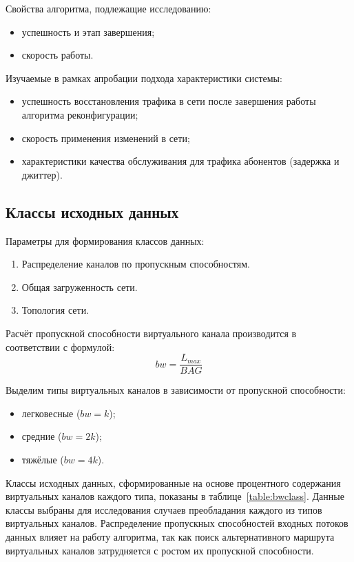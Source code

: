 \documentclass[12pt, a4paper]{article}
\begin{document}
Свойства алгоритма, подлежащие исследованию:
\begin{itemize}
	\item успешность и этап завершения;
	\item скорость работы.
\end{itemize}

Изучаемые в рамках апробации подхода характеристики системы:
\begin{itemize}
	\item успешность восстановления трафика в сети после завершения работы алгоритма реконфигурации;
	\item скорость применения изменений в сети;
	\item характеристики качества обслуживания для трафика абонентов (задержка и джиттер).
\end{itemize}

\subsection{Классы исходных данных}
Параметры для формирования классов данных:
\begin{enumerate}
	\item Распределение каналов по пропускным способностям.
	\item Общая загруженность сети.
	\item Топология сети.
\end{enumerate}

Расчёт пропускной способности виртуального канала производится в соответствии с формулой:
$$bw = \frac{L_{max}}{BAG}$$

Выделим типы виртуальных каналов в зависимости от пропускной способности:
\begin{itemize}
	\item легковесные ($bw=k$);
	\item средние ($bw=2k$);
	\item тяжёлые ($bw=4k$).
\end{itemize}

Классы исходных данных, сформированные на основе процентного содержания виртуальных каналов каждого типа, показаны в таблице~\ref{table:bwclass}. Данные классы выбраны для исследования случаев преобладания каждого из типов виртуальных каналов. Распределение пропускных способностей входных потоков данных влияет на работу алгоритма, так как поиск альтернативного маршрута виртуальных каналов затрудняется с ростом их пропускной способности.
\end{document}
